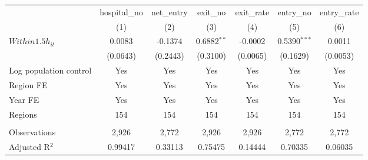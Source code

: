 \begingroup
\centering
\begin{tabular}{lcccccc}
   \toprule
                          & hospital\_no  & net\_entry  & exit\_no      & exit\_rate  & entry\_no      & entry\_rate \\    
                          & (1)           & (2)         & (3)           & (4)         & (5)            & (6)\\  
   \midrule 
   $Within1.5h_{it}$      & 0.0083        & -0.1374     & 0.6882$^{**}$ & -0.0002     & 0.5390$^{***}$ & 0.0011\\   
                          & (0.0643)      & (0.2443)    & (0.3100)      & (0.0065)    & (0.1629)       & (0.0053)\\   
   Log population control & Yes           & Yes         & Yes           & Yes         & Yes            & Yes\\  
   Region FE              & Yes           & Yes         & Yes           & Yes         & Yes            & Yes\\  
   Year FE                & Yes           & Yes         & Yes           & Yes         & Yes            & Yes\\  
   Regions                & 154           & 154         & 154           & 154         & 154            & 154\\  
    \\
   Observations           & 2,926         & 2,772       & 2,926         & 2,926       & 2,772          & 2,772\\  
   Adjusted R$^2$         & 0.99417       & 0.33113     & 0.75475       & 0.14444     & 0.70335        & 0.06035\\  
   \bottomrule
\end{tabular}
\par\endgroup
